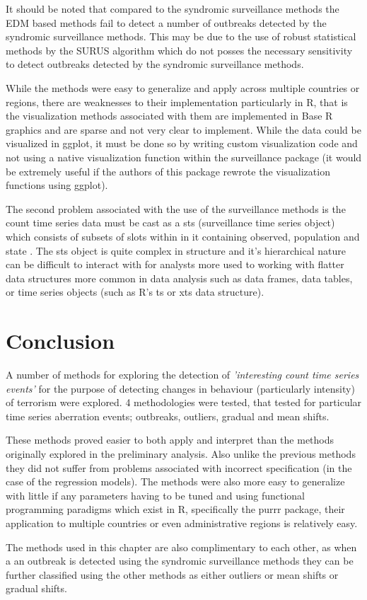 It should be noted that compared to the syndromic surveillance methods the EDM based methods fail to detect a number of outbreaks detected by the syndromic surveillance methods. This may be due to the use of robust statistical methods by the SURUS algorithm which do not posses the necessary sensitivity to detect outbreaks detected by the syndromic surveillance methods. 

While the methods were easy to generalize and apply across multiple countries or regions, there are weaknesses to their implementation particularly in R, that is the visualization methods associated with them are implemented in Base R graphics and are sparse and not very clear to implement. While the data could be visualized in ggplot, it must be done so by writing custom visualization code and not using a native visualization function within the surveillance package (it would be extremely useful if the authors of this package rewrote the visualization functions using ggplot). 

The second problem associated with the use of the surveillance methods is the count time series data must be cast as a sts (surveillance time series object) which consists of subsets of slots within in it containing observed, population and state \citep{hohle2007r}. The sts object is quite complex in structure and it’s hierarchical nature can be difficult to interact with for analysts more used to working with flatter data structures more common in data analysis such as data frames, data tables, or time series objects (such as R’s ts or xts data structure).

\section{Conclusion}

A number of methods for exploring the detection of \textit{'interesting count time series events'} for the purpose of detecting changes in behaviour (particularly intensity) of terrorism were explored. 4 methodologies were tested, that tested for particular time series aberration events; outbreaks, outliers, gradual and mean shifts.  

These methods proved easier to both apply and interpret than the methods originally explored in the preliminary analysis. Also unlike the previous methods they did not suffer from problems associated with incorrect specification (in the case of the regression models). The methods were also more easy to generalize with little if any parameters having to be tuned and using functional programming paradigms which exist in R, specifically the purrr package, their application to multiple countries or even administrative regions is relatively easy.

The methods used in this chapter are also complimentary to each other, as when a an outbreak is detected using the syndromic surveillance methods they can be further classified using the other methods as either outliers or mean shifts or gradual shifts.
